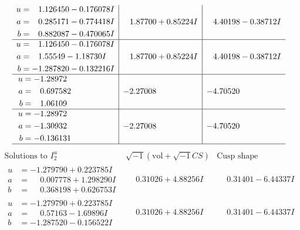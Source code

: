 \documentclass[1p]{elsarticle_modified}
\theoremstyle{definition}
\newcommand{\I}{\sqrt{-1}}
\begin{document}
$$\begin{array}{c|c|c}
\begin{aligned}
u &= \phantom{-}1.126450 - 0.176078 I \\
a &= \phantom{-}0.285171 - 0.774418 I \\
b &= \phantom{-}0.882087 - 0.470065 I\end{aligned}
 & \phantom{-}1.87700 + 0.85224 I & \phantom{-}4.40198 - 0.38712 I \\ \hline\begin{aligned}
u &= \phantom{-}1.126450 - 0.176078 I \\
a &= \phantom{-}1.55549 - 1.18730 I \\
b &= -1.287820 - 0.132216 I\end{aligned}
 & \phantom{-}1.87700 + 0.85224 I & \phantom{-}4.40198 - 0.38712 I \\ \hline\begin{aligned}
u &= -1.28972\phantom{ +0.000000I} \\
a &= \phantom{-}0.697582\phantom{ +0.000000I} \\
b &= \phantom{-}1.06109\phantom{ +0.000000I}\end{aligned}
 & -2.27008\phantom{ +0.000000I} & -4.70520\phantom{ +0.000000I} \\ \hline\begin{aligned}
u &= -1.28972\phantom{ +0.000000I} \\
a &= -1.30932\phantom{ +0.000000I} \\
b &= -0.136131\phantom{ +0.000000I}\end{aligned}
 & -2.27008\phantom{ +0.000000I} & -4.70520\phantom{ +0.000000I}\\
 \hline 
 \end{array}$$\newpage$$\begin{array}{c|c|c}  
\text{Solutions to }I^u_{2}& \I (\text{vol} + \sqrt{-1}CS) & \text{Cusp shape}\\
 \hline 
\begin{aligned}
u &= -1.279790 + 0.223785 I \\
a &= \phantom{-}0.007778 + 1.298290 I \\
b &= \phantom{-}0.368198 + 0.626753 I\end{aligned}
 & \phantom{-}0.31026 + 4.88256 I & \phantom{-}0.31401 - 6.44337 I \\ \hline\begin{aligned}
u &= -1.279790 + 0.223785 I \\
a &= \phantom{-}0.57163 - 1.69896 I \\
b &= -1.287520 - 0.156522 I\end{aligned}
 & \phantom{-}0.31026 + 4.88256 I & \phantom{-}0.31401 - 6.44337 I \\ \hline\begin{aligned}

\end{aligned}
\end{array}$$
\end{document}
